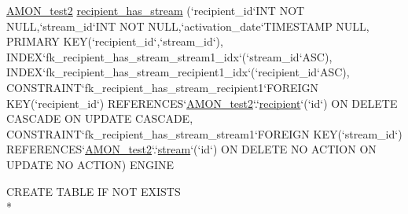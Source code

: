 \begin{DoxyCompactItemize}
\hyperlink{db__mc__build_8sql_a19c21c59303d8b6591b92240ff7de1d5}{A\-M\-O\-N\-\_\-test2} \hyperlink{db__mc__build_8sql_aef868785a9a16804a0b2b90f55606e47}{recipient\-\_\-has\-\_\-stream} (`recipient\-\_\-id`I\-N\-T N\-O\-T N\-U\-L\-L,`stream\-\_\-id`I\-N\-T N\-O\-T N\-U\-L\-L,`activation\-\_\-date`T\-I\-M\-E\-S\-T\-A\-M\-P N\-U\-L\-L, P\-R\-I\-M\-A\-R\-Y K\-E\-Y(`recipient\-\_\-id`,`stream\-\_\-id`), I\-N\-D\-E\-X`fk\-\_\-recipient\-\_\-has\-\_\-stream\-\_\-stream1\-\_\-idx`(`stream\-\_\-id`A\-S\-C), I\-N\-D\-E\-X`fk\-\_\-recipient\-\_\-has\-\_\-stream\-\_\-recipient1\-\_\-idx`(`recipient\-\_\-id`A\-S\-C), C\-O\-N\-S\-T\-R\-A\-I\-N\-T`fk\-\_\-recipient\-\_\-has\-\_\-stream\-\_\-recipient1`F\-O\-R\-E\-I\-G\-N K\-E\-Y(`recipient\-\_\-id`) R\-E\-F\-E\-R\-E\-N\-C\-E\-S`\hyperlink{db__mc__build_8sql_a19c21c59303d8b6591b92240ff7de1d5}{A\-M\-O\-N\-\_\-test2}`.`\hyperlink{db__mc__build_8sql_a3422288d8b436fcb8603925e692b2aa2}{recipient}`(`id`) O\-N D\-E\-L\-E\-T\-E C\-A\-S\-C\-A\-D\-E O\-N U\-P\-D\-A\-T\-E C\-A\-S\-C\-A\-D\-E, C\-O\-N\-S\-T\-R\-A\-I\-N\-T`fk\-\_\-recipient\-\_\-has\-\_\-stream\-\_\-stream1`F\-O\-R\-E\-I\-G\-N K\-E\-Y(`stream\-\_\-id`) R\-E\-F\-E\-R\-E\-N\-C\-E\-S`\hyperlink{db__mc__build_8sql_a19c21c59303d8b6591b92240ff7de1d5}{A\-M\-O\-N\-\_\-test2}`.`\hyperlink{db__mc__build_8sql_a67b7e9fc922cbf49b5ae3124240f4188}{stream}`(`id`) O\-N D\-E\-L\-E\-T\-E N\-O A\-C\-T\-I\-O\-N O\-N U\-P\-D\-A\-T\-E N\-O A\-C\-T\-I\-O\-N) E\-N\-G\-I\-N\-E
\item 
C\-R\-E\-A\-T\-E T\-A\-B\-L\-E I\-F N\-O\-T E\-X\-I\-S\-T\-S \\*

\end{DoxyCompactItemize}
